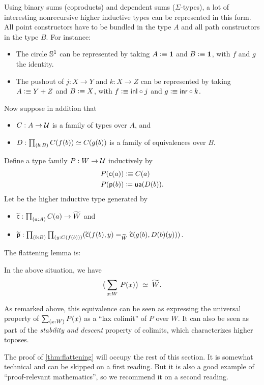 Using binary sums (coproducts) and dependent sums ($\Sigma$-types), a lot of interesting nonrecursive higher
inductive types can be represented in this form. All point constructors have to
be bundled in the type $A$ and all path constructors in the type $B$.
For instance:
\begin{itemize}
\item The circle $\mathbb{S}^1$ can be represented by taking $A\vcentcolon\equiv \mathbf{1}$ and $B\vcentcolon\equiv \mathbf{1}$, with $f$ and $g$ the identity.
\item The pushout of $j:X\to Y$ and $k:X\to Z$ can be represented by taking $A\vcentcolon\equiv Y+Z$ and $B\vcentcolon\equiv X$, with $f\vcentcolon\equiv {\mathsf{inl}} \circ j$ and $g\vcentcolon\equiv {\mathsf{inr}}\circ k$.
\end{itemize}
Now suppose in addition that
\begin{itemize}
\item $C:A\to\mathcal{U}$ is a family of types over $A$, and
\item $D:\prd{b:B}C(f(b))\simeq{}C(g(b))$ is a family of equivalences over $B$.
\end{itemize}
Define a type family $P : W\to\mathcal{U}$ inductively by
\begin{align*}
  P(\mathsf{c}(a)) &\vcentcolon\equiv C(a)\\
  {P}\mathopen{}\left({\mathsf{p}(b)}\right)\mathclose{} &\coloneqq \mathsf{ua}(D(b)).
\end{align*}
Let \Wtil be the higher inductive type generated by
\begin{itemize}
\item $\cct:\prd{a:A} C(a) \to \Wtil$ and
\item $\ppt:\prd{b:B}{y:C(f(b))} (\cct(f(b),y)=_{\Wtil}\cct(g(b),D(b)(y)))$.
\end{itemize}

The flattening lemma is:

\begin{lem}\label{thm:flattening}
  In the above situation, we have
  \[ \big(\sm{x:W} P(x)\big) \;\simeq\; \widetilde{W}. \]
\end{lem}

As remarked above, this equivalence can be seen as expressing the universal property of $\sm{x:W} P(x)$ as a ``lax colimit'' of $P$ over $W$.
It can also be seen as part of the \emph{stability and descent} property of colimits, which characterizes higher toposes.

The proof of \autoref{thm:flattening} will occupy the rest of this section.
It is somewhat technical and can be skipped on a first reading.
But it is also a good example of ``proof-relevant mathematics'', so we recommend it on a second reading.

